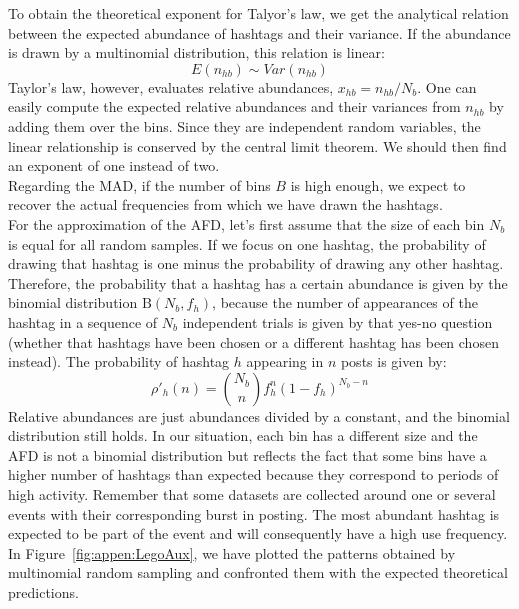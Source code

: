 To obtain the theoretical exponent for Talyor's law, we get the analytical relation between the expected abundance of hashtags and their variance. If the abundance is drawn by a multinomial distribution, this relation is linear:
\begin{equation}
    E(n_{hb}) \sim Var(n_{hb})
\end{equation}
Taylor's law, however, evaluates relative abundances, $x_{hb} = n_{hb}/N_b$. One can easily compute the expected relative abundances and their variances from $ n_{hb}$ by adding them over the bins. Since they are independent random variables, the linear relationship is conserved by the central limit theorem. We should then find an exponent of one instead of two.\\

Regarding the MAD, if the number of bins $B$ is high enough, we expect to recover the actual frequencies from which we have drawn the hashtags. \\

For the approximation of the AFD, let's first assume that the size of each  bin $N_b$ is equal for all random samples. If we focus on one hashtag, the probability of drawing that hashtag is one minus the probability of drawing any other hashtag. Therefore, the probability that a hashtag has a certain abundance is given by the binomial distribution $\textrm{B}(N_b,f_h)$, because the number of appearances of the hashtag in a sequence of $N_b$ independent trials is given by that yes-no question (whether that hashtags have been chosen or a different hashtag has been chosen instead). The probability of hashtag $h$ appearing in $n$ posts is given by:
\begin{equation}
    \rho'_h(n)  = {N_b\choose n} f_h^n (1-f_h)^{N_b-n} 
\end{equation}
Relative abundances are just abundances divided by a constant, and the binomial distribution still holds. In our situation, each bin has a different size and the AFD is not a binomial distribution but reflects the fact that some bins have a higher number of hashtags than expected because they correspond to periods of high activity. Remember that some datasets are collected around one or several events with their corresponding burst in posting. The most abundant hashtag is expected to be part of the event and will consequently have a high use frequency. \\

In Figure~\ref{fig:appen:LegoAux}, we have plotted the patterns obtained by multinomial random sampling and confronted them with the expected theoretical predictions.

